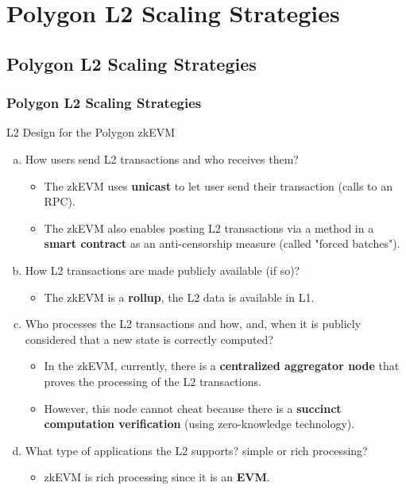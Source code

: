 

\renewcommand{\mytitle}{Polygon L2 Scaling Strategies}
\ifZEROSEC \fi
\ifSEC \section{\mytitle{}}\fi
\ifSUBSEC \subsection{\mytitle{}}\fi
\ifSUBSUBSEC \subsubsection{\mytitle{}}\fi






\begin{frame}{L2 Design for the Polygon zkEVM}
\begin{enumerate}[a)]
\item How users send L2 transactions and who receives them?
  \begin{itemize}
  \item The zkEVM uses \textbf{unicast} to let user send their transaction (calls to an RPC).
  \item The zkEVM also enables posting L2 transactions via a method in a \textbf{smart contract}
  as an anti-censorship measure (called "forced batches").
  \end{itemize}
\item How L2 transactions are made publicly available (if so)?
  \begin{itemize}
  \item The zkEVM is a \textbf{rollup}, the L2 data is available in L1.
  \end{itemize}
\item Who processes the L2 transactions and how, and, when
it is publicly considered that a new state is correctly computed?
  \begin{itemize}
  \item In the zkEVM, currently, there is a \textbf{centralized aggregator node} that proves the
 processing of the L2 transactions.
  \item However, this node cannot cheat because there is a \textbf{succinct computation verification}
  (using zero-knowledge technology).
  \end{itemize}
\item What type of applications the L2 supports? simple or rich processing?
  \begin{itemize}
  \item zkEVM is rich processing since it is an \textbf{EVM}.
  \end{itemize}
\end{enumerate}
\end{frame}